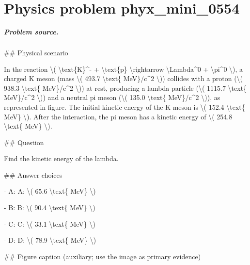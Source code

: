 
\chapter{Physics problem phyx\_mini\_0554}
\label{ch:PhyXMiniProblems_problem_phyx_mini_0554}

\paragraph{Problem source.}
\#\# Physical scenario

In the reaction \textbackslash{}( \textbackslash{}text\{K\}\textasciicircum{}- + \textbackslash{}text\{p\} \textbackslash{}rightarrow \textbackslash{}Lambda\textasciicircum{}0 + \textbackslash{}pi\textasciicircum{}0 \textbackslash{}), a charged K meson (mass \textbackslash{}( 493.7 \textbackslash{}text\{ MeV\}/c\textasciicircum{}2 \textbackslash{})) collides with a proton (\textbackslash{}( 938.3 \textbackslash{}text\{ MeV\}/c\textasciicircum{}2 \textbackslash{})) at rest, producing a lambda particle (\textbackslash{}( 1115.7 \textbackslash{}text\{ MeV\}/c\textasciicircum{}2 \textbackslash{})) and a neutral pi meson (\textbackslash{}( 135.0 \textbackslash{}text\{ MeV\}/c\textasciicircum{}2 \textbackslash{})), as represented in figure. The initial kinetic energy of the K meson is \textbackslash{}( 152.4 \textbackslash{}text\{ MeV\} \textbackslash{}). After the interaction, the pi meson has a kinetic energy of \textbackslash{}( 254.8 \textbackslash{}text\{ MeV\} \textbackslash{}).

\#\# Question

Find the kinetic energy of the lambda.

\#\# Answer choices

- A: A: \textbackslash{}( 65.6 \textbackslash{}text\{ MeV\} \textbackslash{})

- B: B: \textbackslash{}( 90.4 \textbackslash{}text\{ MeV\} \textbackslash{})

- C: C: \textbackslash{}( 33.1 \textbackslash{}text\{ MeV\} \textbackslash{})

- D: D: \textbackslash{}( 78.9 \textbackslash{}text\{ MeV\} \textbackslash{})

\#\# Figure caption (auxiliary; use the image as primary evidence)

